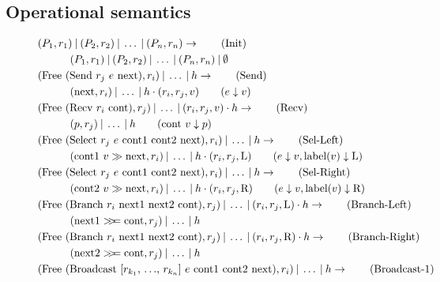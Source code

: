 \subsection{Operational semantics}
\begin{figure}[ht]
\begin{align*}
    &(P_1, r_1) \Par (P_2, r_2) \Par \ldots \Par (P_n, r_n) \rightarrow \tag{Init}\\ 
    &\qquad \quad (P_1, r_1) \Par (P_2, r_2) \Par \ldots \Par (P_n, r_n) \Par \emptyset \notag\\ 
    &(\text{Free (Send $r_j$ $e$ next)}, r_i) \Par \ldots \Par h \rightarrow  \tag{Send}\\ 
    &\qquad \quad (\text{next} , r_i) \Par \ldots \Par h \cdot (r_i, r_j, v) \qquad (e \downarrow v) \notag\\ 
    &(\text{Free (Recv $r_i$ cont)}, r_j) \Par \ldots \Par (r_i, r_j, v) \cdot h \rightarrow  \tag{Recv}\\ 
    &\qquad \quad (p, r_j) \Par \ldots \Par h \qquad (\text{cont $v$} \downarrow p)\notag\\ 
    &(\text{Free (Select $r_j$ $e$ cont1 cont2 next)}, r_i) \Par \ldots \Par h \rightarrow  \tag{Sel-Left}\\ 
    &\qquad \quad (\text{cont1 $v$} \gg \text{next}, r_i) \Par \ldots \Par h \cdot (r_i, r_j, \text{L}) \qquad (e \downarrow v, \text{label}(v) \downarrow \text{L}) \notag\\ 
    &(\text{Free (Select $r_j$ $e$ cont1 cont2 next)}, r_i) \Par \ldots \Par h \rightarrow  \tag{Sel-Right}\\ 
    &\qquad \quad (\text{cont2 $v$} \gg \text{next}, r_i) \Par \ldots \Par h \cdot (r_i, r_j, \text{R}) \qquad (e \downarrow v, \text{label}(v) \downarrow \text{R}) \notag\\ 
    &(\text{Free (Branch $r_i$ next1 next2 cont)}, r_j) \Par \ldots \Par (r_i, r_j, \text{L}) \cdot h \rightarrow  \tag{Branch-Left}\\ 
    &\qquad \quad (\text{next1} >\!\!>\!\!= \text{cont}, r_j) \Par \ldots \Par h \notag\\ 
    &(\text{Free (Branch $r_i$ next1 next2 cont)}, r_j) \Par \ldots \Par (r_i, r_j, \text{R}) \cdot h \rightarrow  \tag{Branch-Right}\\ 
    &\qquad \quad (\text{next2} >\!\!>\!\!= \text{cont}, r_j) \Par \ldots \Par h \notag\\ 
    &(\text{Free (Broadcast [$r_{k_1}$, $\ldots$, $r_{k_n}$] $e$ cont1 cont2 next)}, r_i) \Par \ldots \Par h \rightarrow  \tag{Broadcast-1}\\ 

\end{align*}
\end{figure}
